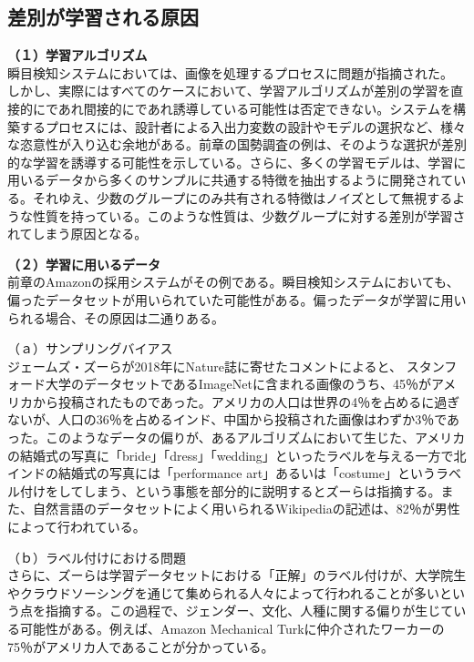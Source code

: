 \documentclass[b5j,twoside,twocolumn]{utarticle}
\begin{document}
\subsection{差別が学習される原因}
\textbf{（１）学習アルゴリズム}\\
瞬目検知システムにおいては、画像を処理するプロセスに問題が指摘された。
しかし、実際にはすべてのケースにおいて、学習アルゴリズムが差別の学習を直接的にであれ間接的にであれ誘導している可能性は否定できない。システムを構築するプロセスには、設計者による入出力変数の設計やモデルの選択など、様々な恣意性が入り込む余地がある。前章の国勢調査の例は、そのような選択が差別的な学習を誘導する可能性を示している。さらに、多くの学習モデルは、学習に用いるデータから多くのサンプルに共通する特徴を抽出するように開発されている。それゆえ、少数のグループにのみ共有される特徴はノイズとして無視するような性質を持っている。このような性質は、少数グループに対する差別が学習されてしまう原因となる。


\textbf{（２）学習に用いるデータ}\\
前章のAmazonの採用システムがその例である。瞬目検知システムにおいても、偏ったデータセットが用いられていた可能性がある。偏ったデータが学習に用いられる場合、その原因は二通りある。


（ａ）サンプリングバイアス\\
ジェームズ・ズーらが2018年にNature誌に寄せたコメントによると、
スタンフォード大学のデータセットであるImageNetに含まれる画像のうち、45％がアメリカから投稿されたものであった。アメリカの人口は世界の4％を占めるに過ぎないが、人口の36％を占めるインド、中国から投稿された画像はわずか3％であった。このようなデータの偏りが、あるアルゴリズムにおいて生じた、アメリカの結婚式の写真に「bride」「dress」「wedding」といったラベルを与える一方で北インドの結婚式の写真には「performance art」あるいは「costume」というラベル付けをしてしまう、という事態を部分的に説明するとズーらは指摘する。また、自然言語のデータセットによく用いられるWikipediaの記述は、82％が男性によって行われている。


（ｂ）ラベル付けにおける問題\\
さらに、ズーらは学習データセットにおける「正解」のラベル付けが、大学院生やクラウドソーシングを通じて集められる人々によって行われることが多いという点を指摘する。この過程で、ジェンダー、文化、人種に関する偏りが生じている可能性がある。例えば、Amazon Mechanical Turkに仲介されたワーカーの75％がアメリカ人であることが分かっている。
\end{document}
